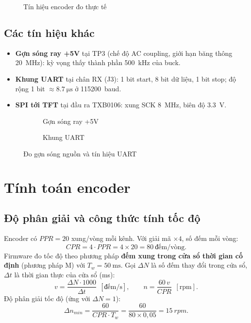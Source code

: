 \begin{figure}[H]
\centering
{}
\caption{Tín hiệu encoder đo thực tế}
\label{fig:osc_enc}
\end{figure}

\subsection{Các tín hiệu khác}
\begin{itemize}
  \item \textbf{Gợn sóng ray +5V} tại TP3 (chế độ AC coupling, giới hạn băng thông \SI{20}{\mega\hertz}): kỳ vọng thấy thành phần \SI{500}{\kilo\hertz} của buck.
  \item \textbf{Khung UART} tại chân RX (J3): 1 bit start, 8 bit dữ liệu, 1 bit stop; độ rộng 1 bit $\approx\SI{8.7}{\micro\second}$ ở \SI{115200}{baud}.
  \item \textbf{SPI tới TFT} tại đầu ra TXB0106: xung SCK \SI{8}{\mega\hertz}, biên độ \SI{3.3}{\volt}.
\end{itemize}

\begin{figure}[H]
\centering
\begin{subfigure}{0.49\linewidth}\centering{}\caption{Gợn sóng ray +5V}\end{subfigure}\hfill
\begin{subfigure}{0.49\linewidth}\centering{}\caption{Khung UART}\end{subfigure}
\caption{Đo gợn sóng nguồn và tín hiệu UART}
\label{fig:osc_other}
\end{figure}

\section{Tính toán encoder}
\label{sec:encoder}

\subsection{Độ phân giải và công thức tính tốc độ}
Encoder có $PPR=20$ xung/vòng mỗi kênh. Với giải mã $\times4$, số đếm mỗi vòng:
\begin{equation}
  CPR = 4\cdot PPR = 4\times20 = 80 \ \text{đếm/vòng}.
\end{equation}
Firmware đo tốc độ theo phương pháp \textbf{đếm xung trong cửa sổ thời gian cố định} (phương pháp M) với $T_w=\SI{50}{\milli\second}$. Gọi $\Delta N$ là số đếm thay đổi trong cửa sổ, $\Delta t$ là thời gian thực của cửa sổ (ms):
\begin{equation}
  v = \frac{\Delta N\cdot1000}{\Delta t}\ \ [\text{đếm/s}],\qquad
  n = \frac{60\,v}{CPR}\ \ [\text{rpm}].
\end{equation}
Độ phân giải tốc độ (ứng với $\Delta N=1$):
\begin{equation}
  \Delta n_{min}=\frac{60}{CPR\cdot T_w}=\frac{60}{80\times0{,}05}=\SI{15}{rpm}.
\end{equation}

